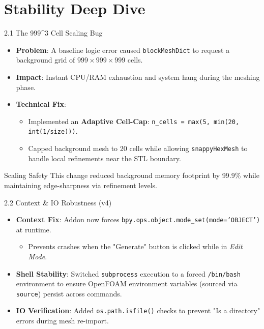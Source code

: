 \documentclass[dvipsnames,mathserif]{beamer}
\begin{document}
\section{Stability Deep Dive}
\begin{frame}{2.1 The 999\textasciicircum3 Cell Scaling Bug}
    \begin{itemize}
        \item \textbf{Problem}: A baseline logic error caused \texttt{blockMeshDict} to request a background grid of $999 \times 999 \times 999$ cells.
        \item \textbf{Impact}: Instant CPU/RAM exhaustion and system hang during the meshing phase.
        \item \textbf{Technical Fix}:
        \begin{itemize}
            \item Implemented an \textbf{Adaptive Cell-Cap}: \texttt{n\_cells = max(5, min(20, int(1/size)))}.
            \item Capped background mesh to 20 cells while allowing \texttt{snappyHexMesh} to handle local refinements near the STL boundary.
        \end{itemize}
    \end{itemize}
    \begin{center}
        \begin{alertblock}{Scaling Safety}
            This change reduced background memory footprint by 99.9\% while maintaining edge-sharpness via refinement levels.
        \end{alertblock}
    \end{center}
\end{frame}

\begin{frame}{2.2 Context \& IO Robustness (v4)}
    \begin{itemize}
        \item \textbf{Context Fix}: Addon now forces \texttt{bpy.ops.object.mode\_set(mode='OBJECT')} at runtime. 
        \begin{itemize}
            \item Prevents crashes when the "Generate" button is clicked while in \textit{Edit Mode}.
        \end{itemize}
        \item \textbf{Shell Stability}: Switched \texttt{subprocess} execution to a forced \texttt{/bin/bash} environment to ensure OpenFOAM environment variables (sourced via \texttt{source}) persist across commands.
        \item \textbf{IO Verification}: Added \texttt{os.path.isfile()} checks to prevent "Is a directory" errors during mesh re-import.
    \end{itemize}
\end{frame}
\end{document}

